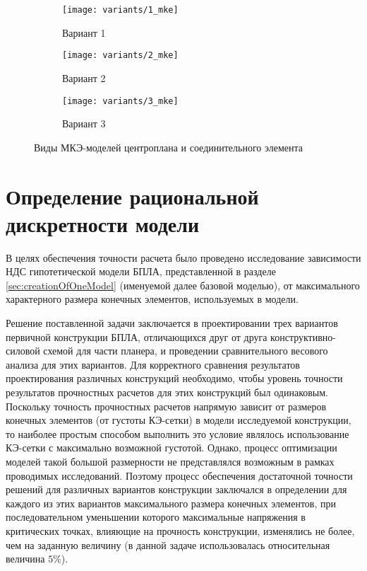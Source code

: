 \begin{figure}[H]
\centering
\begin{subfigure}[b]{0.32\textwidth}
	\texttt{[image: variants/1\_mke]}		\caption{Вариант 1}
	\label{fig:variants_mke:1}
\end{subfigure}
\hspace{\fill}
\begin{subfigure}[b]{0.32\textwidth}
	\texttt{[image: variants/2\_mke]}
		\caption{Вариант 2}
		\label{fig:variants_mke:2}
\end{subfigure}
\hspace{\fill}
\begin{subfigure}[b]{0.32\textwidth}
	\texttt{[image: variants/3\_mke]}
		\caption{Вариант 3}
		\label{fig:variants_mke:3}
\end{subfigure}
\hspace{\fill}
\caption{Виды МКЭ-моделей центроплана и соединительного элемента}
\label{fig:variants_mke}
\end{figure}	



\section{Определение рациональной дискретности модели}
\label{sec:optimalMKESize}

В целях обеспечения точности расчета было проведено исследование зависимости 
НДС гипотетической модели БПЛА, представленной в разделе \ref{sec:creationOfOneModel} (именуемой далее базовой моделью), от максимального характерного размера конечных элементов, используемых в модели. 

Решение поставленной задачи заключается в проектировании трех вариантов первичной конструкции БПЛА, отличающихся друг от друга конструктивно-силовой схемой для части планера, и проведении сравнительного весового анализа для этих вариантов. Для корректного сравнения результатов проектирования различных конструкций необходимо, чтобы уровень точности результатов прочностных расчетов для этих конструкций был одинаковым. Поскольку точность прочностных расчетов напрямую зависит от размеров конечных элементов (от густоты КЭ-сетки) в модели исследуемой конструкции, то наиболее простым способом выполнить это условие являлось использование КЭ-сетки с максимально возможной густотой. Однако, процесс оптимизации моделей такой большой размерности не представлялся возможным в рамках проводимых исследований. Поэтому процесс обеспечения достаточной точности решений для различных вариантов конструкции заключался в определении для каждого из этих вариантов максимального размера конечных элементов, при последовательном уменьшении которого максимальные напряжения в критических точках, влияющие на прочность конструкции, изменялись не более, чем на заданную величину (в данной задаче использовалась относительная величина $5\%$).


